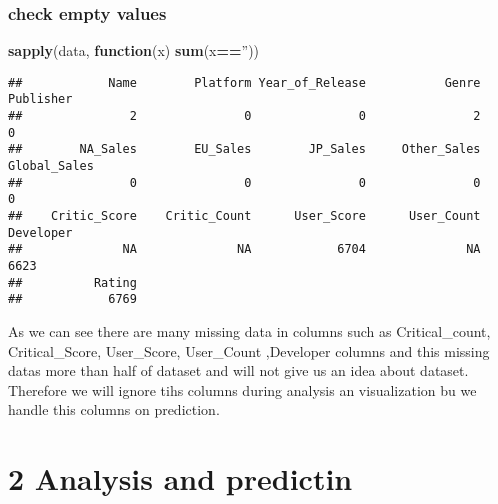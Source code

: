 \documentclass[]{article}
\newenvironment{Shaded}{\begin{snugshade}}{\end{snugshade}}
\newcommand{\ControlFlowTok}[1]{\textcolor[rgb]{0.13,0.29,0.53}{\textbf{#1}}}
\newcommand{\DecValTok}[1]{\textcolor[rgb]{0.00,0.00,0.81}{#1}}
\newcommand{\KeywordTok}[1]{\textcolor[rgb]{0.13,0.29,0.53}{\textbf{#1}}}
\newcommand{\NormalTok}[1]{#1}
\newcommand{\OperatorTok}[1]{\textcolor[rgb]{0.81,0.36,0.00}{\textbf{#1}}}
\newcommand{\StringTok}[1]{\textcolor[rgb]{0.31,0.60,0.02}{#1}}
\begin{document}
\hypertarget{check-empty-values}{%
\subsubsection{check empty values}\label{check-empty-values}}

\begin{Shaded}
\begin{Highlighting}[]
\KeywordTok{sapply}\NormalTok{(data, }\ControlFlowTok{function}\NormalTok{(x) }\KeywordTok{sum}\NormalTok{(x}\OperatorTok{==}\StringTok{''}\NormalTok{))}
\end{Highlighting}
\end{Shaded}

\begin{verbatim}
##            Name        Platform Year_of_Release           Genre       Publisher 
##               2               0               0               2               0 
##        NA_Sales        EU_Sales        JP_Sales     Other_Sales    Global_Sales 
##               0               0               0               0               0 
##    Critic_Score    Critic_Count      User_Score      User_Count       Developer 
##              NA              NA            6704              NA            6623 
##          Rating 
##            6769
\end{verbatim}

As we can see there are many missing data in columns such as
Critical\_count, Critical\_Score, User\_Score, User\_Count ,Developer
columns and this missing datas more than half of dataset and will not
give us an idea about dataset. Therefore we will ignore tihs columns
during analysis an visualization bu we handle this columns on
prediction.

\begin{Shaded}
\end{Shaded}

\hypertarget{analysis-and-predictin}{%
\section{2 Analysis and predictin}\label{analysis-and-predictin}}
\end{document}
